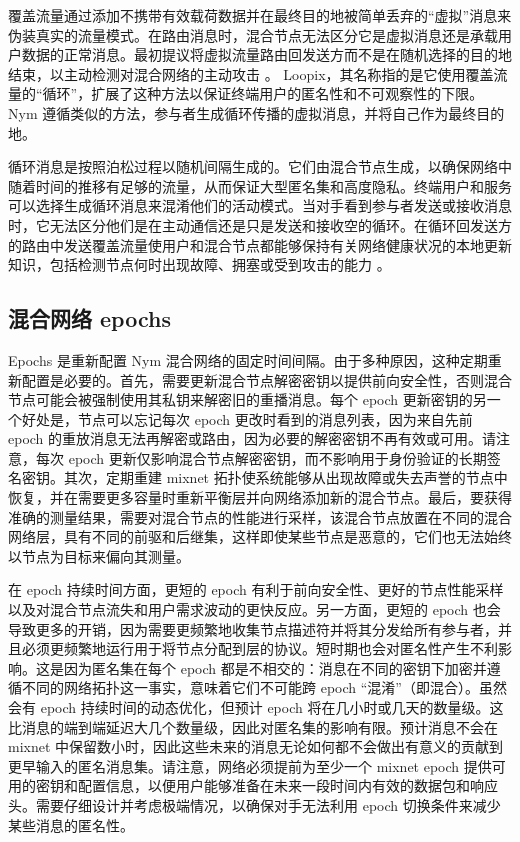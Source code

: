 \documentclass{article}
\begin{document}
	覆盖流量通过添加不携带有效载荷数据并在最终目的地被简单丢弃的“虚拟”消息来伪装真实的流量模式。在路由消息时，混合节点无法区分它是虚拟消息还是承载用户数据的正常消息。最初提议将虚拟流量路由回发送方而不是在随机选择的目的地结束，以主动检测对混合网络的主动攻击 \cite{ref30}。 Loopix，其名称指的是它使用覆盖流量的“循环”，扩展了这种方法以保证终端用户的匿名性和不可观察性的下限\cite{ref89}。Nym 遵循类似的方法，参与者生成循环传播的虚拟消息，并将自己作为最终目的地。\newline

	循环消息是按照泊松过程以随机间隔生成的。它们由混合节点生成，以确保网络中随着时间的推移有足够的流量，从而保证大型匿名集和高度隐私。终端用户和服务可以选择生成循环消息来混淆他们的活动模式。当对手看到参与者发送或接收消息时，它无法区分他们是在主动通信还是只是发送和接收空的循环。在循环回发送方的路由中发送覆盖流量使用户和混合节点都能够保持有关网络健康状况的本地更新知识，包括检测节点何时出现故障、拥塞或受到攻击的能力 \cite{ref30}。\newline

	\subsection{混合网络 epochs}

	Epochs 是重新配置 Nym 混合网络的固定时间间隔。由于多种原因，这种定期重新配置是必要的。首先，需要更新混合节点解密密钥以提供前向安全性，否则混合节点可能会被强制使用其私钥来解密旧的重播消息。每个 epoch 更新密钥的另一个好处是，节点可以忘记每次 epoch 更改时看到的消息列表，因为来自先前 epoch 的重放消息无法再解密或路由，因为必要的解密密钥不再有效或可用。请注意，每次 epoch 更新仅影响混合节点解密密钥，而不影响用于身份验证的长期签名密钥。其次，定期重建 mixnet 拓扑使系统能够从出现故障或失去声誉的节点中恢复，并在需要更多容量时重新平衡层并向网络添加新的混合节点。最后，要获得准确的测量结果，需要对混合节点的性能进行采样，该混合节点放置在不同的混合网络层，具有不同的前驱和后继集，这样即使某些节点是恶意的，它们也无法始终以节点为目标来偏向其测量。\newline

	在 epoch 持续时间方面，更短的 epoch 有利于前向安全性、更好的节点性能采样以及对混合节点流失和用户需求波动的更快反应。另一方面，更短的 epoch 也会导致更多的开销，因为需要更频繁地收集节点描述符并将其分发给所有参与者，并且必须更频繁地运行用于将节点分配到层的协议。短时期也会对匿名性产生不利影响。这是因为匿名集在每个 epoch 都是不相交的：消息在不同的密钥下加密并遵循不同的网络拓扑这一事实，意味着它们不可能跨 epoch “混淆”（即混合）。虽然会有 epoch 持续时间的动态优化，但预计 epoch 将在几小时或几天的数量级。这比消息的端到端延迟大几个数量级，因此对匿名集的影响有限。预计消息不会在 mixnet 中保留数小时，因此这些未来的消息无论如何都不会做出有意义的贡献到更早输入的匿名消息集。请注意，网络必须提前为至少一个 mixnet epoch 提供可用的密钥和配置信息，以便用户能够准备在未来一段时间内有效的数据包和响应头。需要仔细设计并考虑极端情况，以确保对手无法利用 epoch 切换条件来减少某些消息的匿名性。\newline
\end{document}
